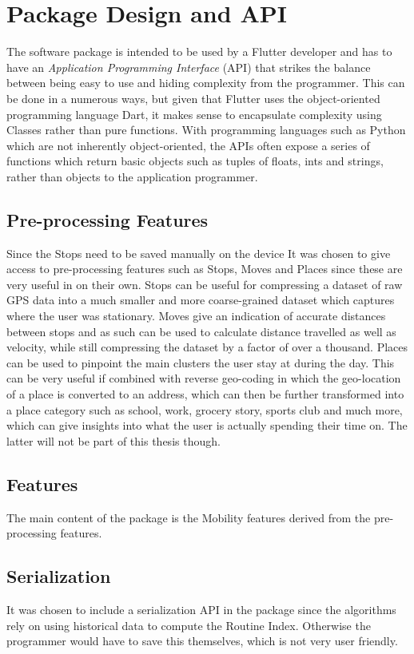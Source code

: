 \section{Package Design and API}
The software package is intended to be used by a Flutter developer and has to have an \textit{Application Programming Interface} (API) that strikes the balance between being easy to use and hiding complexity from the programmer. This can be done in a numerous ways, but given that Flutter uses the object-oriented programming language Dart, it makes sense to encapsulate complexity using Classes rather than pure functions. With programming languages such as Python which are not inherently object-oriented, the APIs often expose a series of functions which return basic objects such as tuples of floats, ints and strings, rather than objects to the application programmer.

\subsection{Pre-processing Features}
Since the Stops need to be saved manually on the device
It was chosen to give access to pre-processing features such as Stops, Moves and Places since these are very useful in on their own. Stops can be useful for compressing a dataset of raw GPS data into a much smaller and more coarse-grained dataset which captures where the user was stationary. Moves give an indication of accurate distances between stops and as such can be used to calculate distance travelled as well as velocity, while still compressing the dataset by a factor of over a thousand. Places can be used to pinpoint the main clusters the user stay at during the day. This can be very useful if combined with reverse geo-coding in which the geo-location of a place is converted to an address, which can then be further transformed into a place category such as school, work, grocery story, sports club and much more, which can give insights into what the user is actually spending their time on. The latter will not be part of this thesis though.

\subsection{Features}
The main content of the package is the Mobility features derived from the pre-processing features. 

\subsection{Serialization}
It was chosen to include a serialization API in the package since the algorithms rely on using historical data to compute the Routine Index. Otherwise the programmer would have to save this themselves, which is not very user friendly.

